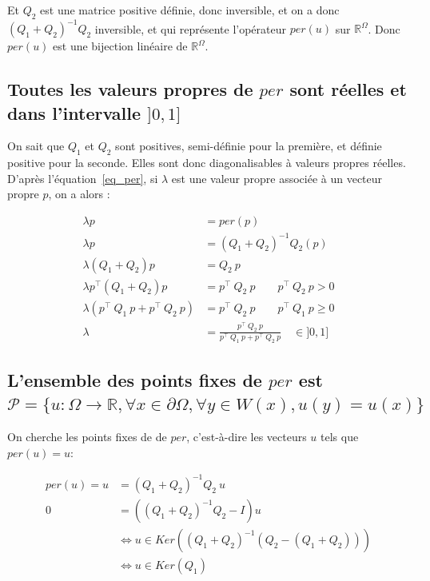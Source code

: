 \documentclass[12pt,a4paper,onecolumn]{article}
\begin{document}
Et \(Q_2\) est une matrice positive définie, donc inversible, et on a donc \(\left(Q_1 + Q_2\right)^{-1}Q_2\) inversible, et qui représente l'opérateur \(per(u)\) sur \( \mathbb{R}^{\Omega}\). Donc \(per(u)\) est une bijection linéaire de \( \mathbb{R}^{\Omega}\).

\subsection{Toutes les valeurs propres de \(per\) sont réelles et dans l'intervalle \(]0,1]\)}

On sait que \(Q_1\) et \(Q_2\) sont positives, semi-définie pour la première, et définie positive pour la seconde. Elles sont donc diagonalisables à valeurs propres réelles. D'après l'équation~\eqref{eq_per}, si \(\lambda\) est une valeur propre associée à un vecteur propre \(p\), on a alors :

\begin{equation}
	\begin{split}
		\lambda p &= per(p)\\
		\lambda p &= \left(Q_1 + Q_2\right)^{-1}Q_2\left(p\right)\\
		\lambda \left(Q_1 + Q_2\right) p &= Q_2~p\\
		\lambda p^{\intercal}\left(Q_1 + Q_2\right) p &= p^{\intercal}~Q_2~p \qquad p^{\intercal}~Q_2~p > 0\\
		\lambda \left(p^{\intercal}~Q_1~p + p^{\intercal}~Q_2~p\right) &= p^{\intercal}~Q_2~p  \qquad p^{\intercal}~Q_1~p \geq 0\\
		\lambda &= \frac{p^{\intercal}~Q_2~p}{p^{\intercal}~Q_1~p + p^{\intercal}~Q_2~p} \quad \in ]0,1]
	\end{split}
	\label{eq_lambda}
\end{equation}

\subsection{L'ensemble des points fixes de \(per\) est \(\mathcal{P} = \{u : \Omega \rightarrow \mathbb{R}, \forall x \in \partial \Omega, \forall y \in W(x), u(y) = u(x) \}\)}

On cherche les points fixes de de \(per\), c'est-à-dire les vecteurs \(u\) tels que \(per(u) = u\):

\begin{equation}
	\begin{split}
		per(u) = u &= \left(Q_1 + Q_2\right)^{-1}Q_2~u\\
		0 &= \left(\left(Q_1 + Q_2\right)^{-1}Q_2 - I\right)u\\
		&\Leftrightarrow u \in Ker\left(\left(Q_1 + Q_2\right)^{-1}\left(Q_2 - (Q_1 + Q_2)\right)\right) \\
		&\Leftrightarrow u \in Ker\left(Q_1\right) \\
	\end{split}
\end{equation}
\end{document}
